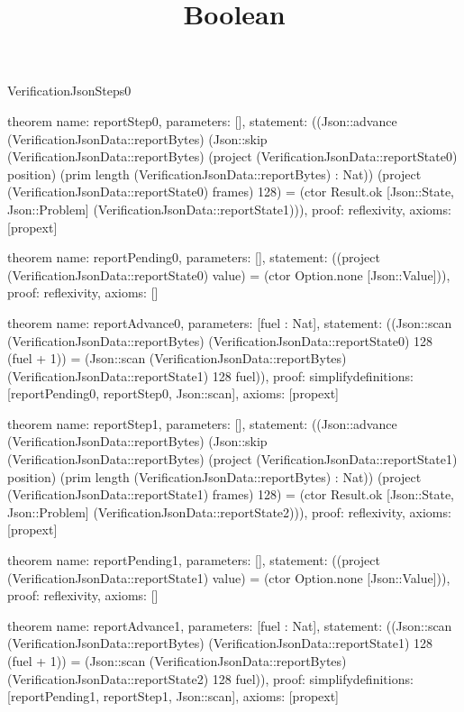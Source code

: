 \begin{lexlean}{VerificationJsonSteps0}
\title{Boolean}
\begin{semanticmodule}

theorem{
  name: reportStep0,
  parameters: [],
  statement: ((Json::advance (VerificationJsonData::reportBytes) (Json::skip (VerificationJsonData::reportBytes) (project (VerificationJsonData::reportState0) position) (prim length (VerificationJsonData::reportBytes) : Nat)) (project (VerificationJsonData::reportState0) frames) 128) = (ctor Result.ok [Json::State, Json::Problem] (VerificationJsonData::reportState1))),
  proof: reflexivity{},
  axioms: [propext]
}

theorem{
  name: reportPending0,
  parameters: [],
  statement: ((project (VerificationJsonData::reportState0) value) = (ctor Option.none [Json::Value])),
  proof: reflexivity{},
  axioms: []
}

theorem{
  name: reportAdvance0,
  parameters: [fuel : Nat],
  statement: ((Json::scan (VerificationJsonData::reportBytes) (VerificationJsonData::reportState0) 128 (fuel + 1)) = (Json::scan (VerificationJsonData::reportBytes) (VerificationJsonData::reportState1) 128 fuel)),
  proof: simplify{definitions: [reportPending0, reportStep0, Json::scan]},
  axioms: [propext]
}

theorem{
  name: reportStep1,
  parameters: [],
  statement: ((Json::advance (VerificationJsonData::reportBytes) (Json::skip (VerificationJsonData::reportBytes) (project (VerificationJsonData::reportState1) position) (prim length (VerificationJsonData::reportBytes) : Nat)) (project (VerificationJsonData::reportState1) frames) 128) = (ctor Result.ok [Json::State, Json::Problem] (VerificationJsonData::reportState2))),
  proof: reflexivity{},
  axioms: [propext]
}

theorem{
  name: reportPending1,
  parameters: [],
  statement: ((project (VerificationJsonData::reportState1) value) = (ctor Option.none [Json::Value])),
  proof: reflexivity{},
  axioms: []
}

theorem{
  name: reportAdvance1,
  parameters: [fuel : Nat],
  statement: ((Json::scan (VerificationJsonData::reportBytes) (VerificationJsonData::reportState1) 128 (fuel + 1)) = (Json::scan (VerificationJsonData::reportBytes) (VerificationJsonData::reportState2) 128 fuel)),
  proof: simplify{definitions: [reportPending1, reportStep1, Json::scan]},
  axioms: [propext]
}


\end{semanticmodule}
\end{lexlean}
